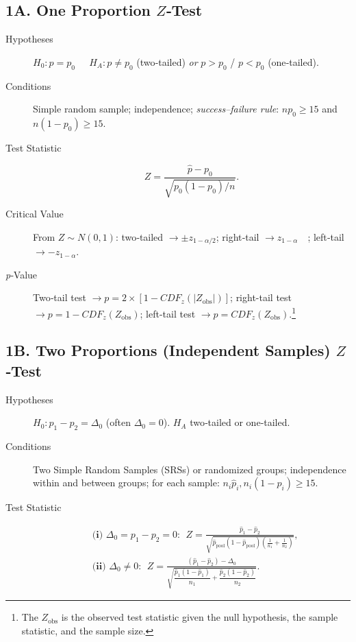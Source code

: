 \documentclass[12pt]{article}
\begin{document}
\subsection*{1A. One Proportion $Z$‐\textbf{Test}}
\begin{description}
  \item[Hypotheses] $H_0\!: p=p_0~~\quad H_A\!: p \neq p_0$ (two‐tailed) \emph{or} $p>p_0$ / $p<p_0$ (one‐tailed).
  \item[Conditions] Simple random sample; independence; \emph{success–failure rule}: $np_0\ge15$ and $n(1-p_0)\ge15$.
  \item[Test Statistic] \[ Z = \dfrac{\hat p - p_0}{\sqrt{p_0(1-p_0)/n}}. \]
  \item[Critical Value] From $Z\sim N(0,1)$: two‐tailed $\rightarrow \pm z_{1-\alpha/2}$; \newline right‐tail $\rightarrow z_{1-\alpha} \quad$; left‐tail $\rightarrow -z_{1-\alpha}$.
  \item[\emph{p}‐Value] Two‐tail test $\rightarrow p=2\times[1-CDF_z(|Z_{\text{obs}}|)]$; right-tail test $\rightarrow p=1-CDF_z(Z_{\text{obs}})$; left-tail test  $\rightarrow p=CDF_z(Z_{\text{obs}})$.\footnote{The $Z_{\text{obs}}$ is the observed test statistic given the null hypothesis, the sample statistic, and the sample size.}
\end{description}

\subsection*{1B. Two Proportions (Independent Samples) $Z$‐\textbf{Test}}
\begin{description}
  \item[Hypotheses] $H_0\!: p_1-p_2=\Delta_0$ (often $\Delta_0=0$). $H_A$ two‐tailed or one‐tailed.
  \item[Conditions] Two Simple Random Samples (SRSs) or randomized groups; independence within and between groups; for each sample: $n_i\hat p_i, n_i(1-\hat p_i)\ge15$.
  \item[Test Statistic]
  \begin{align*}
    &\textbf{(i) }\Delta_0=p_1-p_2=0:~~ Z = \frac{\hat p_1-\hat p_2}{\sqrt{\hat p_{\text{pool}}(1-\hat p_{\text{pool}})(\tfrac1{n_1}+\tfrac1{n_2})}},\\
    &\textbf{(ii) }\Delta_0\neq0:~~ Z = \frac{(\hat p_1-\hat p_2)-\Delta_0}{\sqrt{\dfrac{\hat p_1(1-\hat p_1)}{n_1}+\dfrac{\hat p_2(1-\hat p_2)}{n_2}}}.
  \end{align*}
\end{description}
\end{document}
